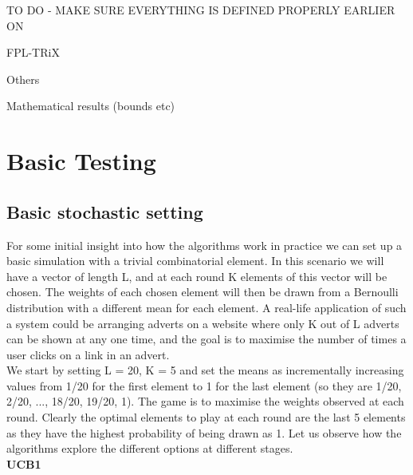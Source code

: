 TO DO - MAKE SURE EVERYTHING IS DEFINED PROPERLY EARLIER ON


FPL-TRiX

Others

Mathematical results (bounds etc)	


\pagebreak


\section{Basic Testing}

\subsection{Basic stochastic setting}

For some initial insight into how the algorithms work in practice we can set up a basic simulation with a trivial combinatorial element. In this scenario we will have a vector of length L, and at each round K elements of this vector will be chosen. The weights of each chosen element will then be drawn from a Bernoulli distribution with a different mean for each element. A real-life application of such a system could be arranging adverts on a website where only K out of L adverts can be shown at any one time, and the goal is to maximise the number of times a user clicks on a link in an advert.\\

We start by setting L = 20, K = 5 and set the means as incrementally increasing values from 1/20 for the first element to 1 for the last element (so they are 1/20, 2/20, ..., 18/20, 19/20, 1). The game is to maximise the weights observed at each round. Clearly the optimal elements to play at each round are the last 5 elements as they have the highest probability of being drawn as 1. Let us observe how the algorithms explore the different options at different stages.\\


\noindent \textbf{UCB1}\\



